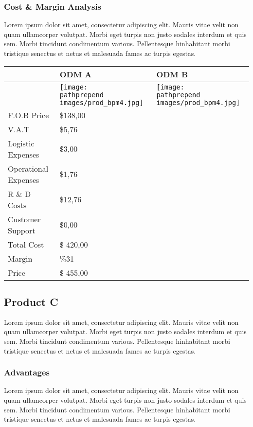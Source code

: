 \documentclass[11pt]{article}
\def\pathprepend{}%
\def\pathprepend{business_plan/}%
\begin{document}
\subsubsection{Cost \& Margin Analysis}
Lorem ipsum dolor sit amet, consectetur adipiscing elit. Mauris vitae velit
non quam ullamcorper volutpat. Morbi eget turpis non justo sodales interdum
et quis sem. Morbi tincidunt condimentum various. Pellentesque hinhabitant morbi
tristique senectus et netus et malesuada fames ac turpis egestas.\newline
\begin{tabular}{ | l | l | l | }\hline
  & ODM A & ODM B \\ \hline
  & \texttt{[image: \\pathprepend images/prod\_bpm4.jpg]} &
		\texttt{[image: \\pathprepend images/prod\_bpm4.jpg]} \\ \hline
  F.O.B Price & \$138,00 &  \\ \hline
  V.A.T & \$5,76 &  \\ \hline
  Logistic Expenses & \$3,00 & \\ \hline
  Operational Expenses & \$1,76 & \\ \hline
  R \& D Costs & \$12,76 &  \\ \hline
  Customer Support & \$0,00 &  \\ \hline
  Total Cost & \$ 420,00 &  \\ \hline
  Margin & \%31 &  \\ \hline
  Price & \$ 455,00 &  \\ \hline
\end{tabular}
\pagebreak

\subsection{Product C}
Lorem ipsum dolor sit amet, consectetur adipiscing elit. Mauris vitae velit
non quam ullamcorper volutpat. Morbi eget turpis non justo sodales interdum
et quis sem. Morbi tincidunt condimentum various. Pellentesque hinhabitant morbi
tristique senectus et netus et malesuada fames ac turpis egestas.\newline
\subsubsection{Advantages}
Lorem ipsum dolor sit amet, consectetur adipiscing elit. Mauris vitae velit
non quam ullamcorper volutpat. Morbi eget turpis non justo sodales interdum
et quis sem. Morbi tincidunt condimentum various. Pellentesque hinhabitant morbi
tristique senectus et netus et malesuada fames ac turpis egestas.\newline
\end{document}
